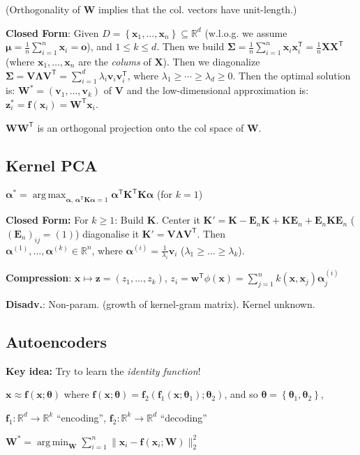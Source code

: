 \documentclass[a4paper,8pt,landscape]{extarticle}
\newcommand{\R}{\mathbb{R}}
\newcommand{\set}[1]{\left\{ #1 \right\}}
\newcommand{\snorm}[1]{\lVert #1 \rVert}
\newcommand*{\T}{\mathsf{T}}
\DeclareMathOperator*{\argmin}{arg\,min}
\DeclareMathOperator*{\argmax}{arg\,max}
\newcommand{\mat}[1]{\mathbf{#1}}
\renewcommand{\vec}[1]{\mathbf{#1}}
\newcommand{\vf}{\vec{f}}
\newcommand{\vo}{\vec{o}}
\newcommand{\vv}{\vec{v}}
\newcommand{\vw}{\vec{w}}
\newcommand{\vx}{\vec{x}}
\newcommand{\vz}{\vec{z}}
\newcommand{\vmu}{\boldsymbol{\mu}}
\newcommand{\valpha}{\boldsymbol{\alpha}}
\newcommand{\vtheta}{\boldsymbol{\theta}}
\newcommand{\ME}{\mat{E}}
\newcommand{\MK}{\mat{K}}
\newcommand{\MV}{\mat{V}}
\newcommand{\MW}{\mat{W}}
\newcommand{\MX}{\mat{X}}
\newcommand{\MSigma}{\mat{\Sigma}}
\newcommand{\MLambda}{\mat{\Lambda}}
\begin{document}
\begin{multicols*}{3}
(Orthogonality of $\MW$ implies that the col. vectors have unit-length.)

\textbf{Closed Form}: Given $D=\set{\vx_1,\ldots,\vx_n}\subseteq\R^d$ (w.l.o.g.
we assume $\vmu=\frac{1}{n}\sum_{i=1}^n\vx_i=\vo$), and $1\leq k\leq d$. Then we
build $\MSigma=\frac{1}{n}\sum_{i=1}^n\vx_i\vx_i^\T=\frac{1}{n}\MX\MX^\T$ (where
$\vx_1,\ldots,\vx_n$ are the \emph{colums} of $\MX$). Then we diagonalize
$\MSigma=\MV\MLambda\MV^\T=\sum_{i=1}^d\lambda_i\vv_i\vv_i^\T$, where
$\lambda_1\geq \cdots\geq\lambda_d\geq 0$. Then the optimal solution is:
$\MW^*=(\vv_1,\ldots,\vv_k)$ of $\MV$ and the low-dimensional approximation is:
$\vz_i^*=\vf(\vx_i)=\MW^\T\vx_i$.

\Com $\MW\MW^\T$ is an orthogonal projection onto the col space of
$\MW$.

\subsection{Kernel PCA}

$\valpha^*=\argmax_{\valpha,\, \valpha^\T\MK\valpha=1}
\valpha^\T\MK^\T\MK\valpha$ (for $k=1$)

\textbf{Closed Form:} For $k\geq 1$: Build $\MK$. Center it
$\MK'=\MK-\ME_n\MK+\MK\ME_n+\ME_n\MK\ME_n$ ($(\ME_n)_{ij}=(1)$) diagonalise it
$\MK'=\MV\MLambda\MV^\T$.
Then\\ $\valpha^{(1)},\ldots,\valpha^{(k)}\in\R^n$, where
$\valpha^{(i)}=\frac{1}{\lambda_i}\vv_i$ ($\lambda_1\geq\ldots\geq\lambda_k$).

\textbf{Compression}: $\vx\mapsto\vz=(z_1,\ldots,z_k)$,
$z_i=\vw^\T\phi(\vx)=\sum_{j=1}^nk(\vx,\vx_j)\valpha^{(i)}_j$

\textbf{Disadv.}: Non-param. (growth of kernel-gram matrix). Kernel unknown.

\subsection{Autoencoders}

\textbf{Key idea:} Try to learn the \emph{identity function}!

$\vx\approx \vf(\vx;\vtheta)$ where
$\vf(\vx;\vtheta)=\vf_2(\vf_1(\vx;\vtheta_1);\vtheta_2)$, and so
$\vtheta=\set{\vtheta_1,\vtheta_2}$,

$\vf_1\colon\R^d\to\R^k$ ``encoding'',\qquad
$\vf_2\colon\R^k\to\R^d$ ``decoding''

$\MW^*=\argmin_{\MW}\sum_{i=1}^n\snorm{\vx_i-\vf(\vx_i;\MW)}_2^2$


\end{multicols*}
\end{document}
